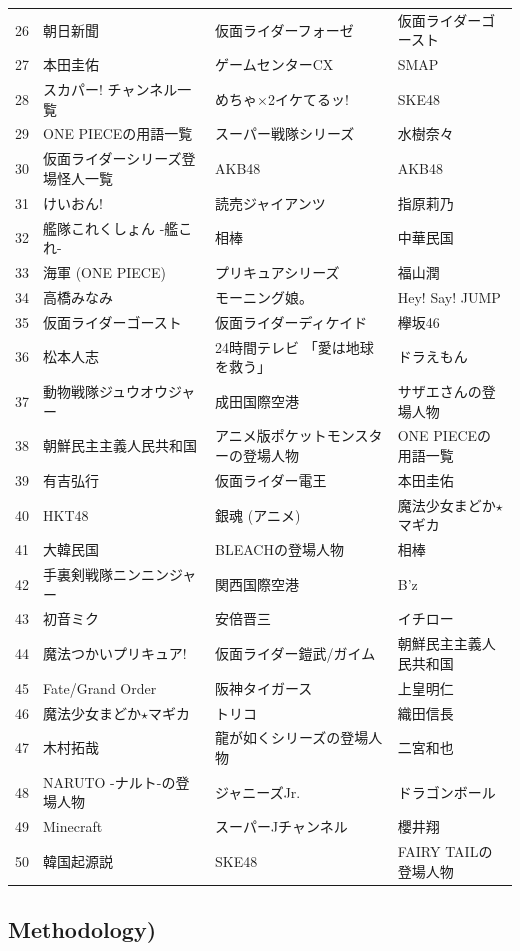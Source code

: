 \documentclass[10pt,british,A4paper,,openany]{memoir}
\begin{document}
\begin{table}
{\begin{tabular}{@{}p{0.1cm}lll@{}}
26&朝日新聞&仮面ライダーフォーゼ&仮面ライダーゴースト\\
27&本田圭佑&ゲームセンターCX&SMAP\\
28&スカパー! チャンネル一覧&めちゃ×2イケてるッ!&SKE48\\
29&ONE PIECEの用語一覧&スーパー戦隊シリーズ&水樹奈々\\
30&仮面ライダーシリーズ登場怪人一覧&AKB48&AKB48\\
31&けいおん!&読売ジャイアンツ&指原莉乃\\
32&艦隊これくしょん -艦これ-&相棒&中華民国\\
33&海軍 (ONE PIECE)&プリキュアシリーズ&福山潤\\
34&高橋みなみ&モーニング娘。&Hey! Say! JUMP\\
35&仮面ライダーゴースト&仮面ライダーディケイド&欅坂46\\
36&松本人志&24時間テレビ 「愛は地球を救う」&ドラえもん\\
37&動物戦隊ジュウオウジャー&成田国際空港&サザエさんの登場人物\\
38&朝鮮民主主義人民共和国&アニメ版ポケットモンスターの登場人物&ONE PIECEの用語一覧\\
39&有吉弘行&仮面ライダー電王&本田圭佑\\
40&HKT48&銀魂 (アニメ)&魔法少女まどか$\star$マギカ\\
41&大韓民国&BLEACHの登場人物&相棒\\
42&手裏剣戦隊ニンニンジャー&関西国際空港&B'z\\
43&初音ミク&安倍晋三&イチロー\\
44&魔法つかいプリキュア!&仮面ライダー鎧武/ガイム&朝鮮民主主義人民共和国\\
45&Fate/Grand Order&阪神タイガース&上皇明仁\\
46&魔法少女まどか$\star$マギカ&トリコ&織田信長\\
47&木村拓哉&龍が如くシリーズの登場人物&二宮和也\\
48&NARUTO -ナルト-の登場人物&ジャニーズJr.&ドラゴンボール\\
49&Minecraft&スーパーJチャンネル&櫻井翔\\
50&韓国起源説&SKE48&FAIRY TAILの登場人物\\
\bottomrule
\end{tabular}
}
\end{table}

\subsection{Methodology)}\label{methodology}

\label{sec:methodology}
\end{document}
